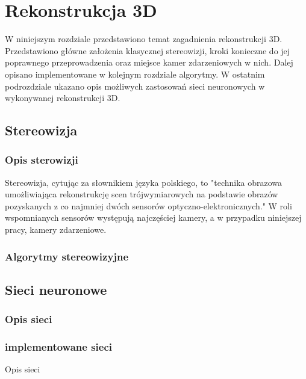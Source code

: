\chapter{Rekonstrukcja 3D}
\label{cha:Rekonstrukcja}
W niniejszym rozdziale przedstawiono temat zagadnienia rekonstrukcji 3D. Przedstawiono główne założenia klasycznej stereowizji, kroki konieczne do jej poprawnego przeprowadzenia oraz miejsce kamer zdarzeniowych w nich. Dalej opisano implementowane w kolejnym rozdziale algorytmy. W ostatnim podrozdziale ukazano opis możliwych zastosowań sieci neuronowych w wykonywanej rekonstrukcji 3D.

\section{Stereowizja}


\subsection{Opis sterowizji}
Stereowizja, cytując za słownikiem języka polskiego, to "technika obrazowa umożliwiająca rekonstrukcję scen trójwymiarowych na podstawie obrazów pozyskanych z co najmniej dwóch sensorów optyczno-elektronicznych." W roli wspomnianych sensorów występują najczęściej kamery, a w przypadku niniejszej pracy, kamery zdarzeniowe.

\subsection{Algorytmy stereowizyjne}

\section{Sieci neuronowe}
    \subsection{Opis sieci}
    
    \subsection{implementowane sieci}
Opis sieci

